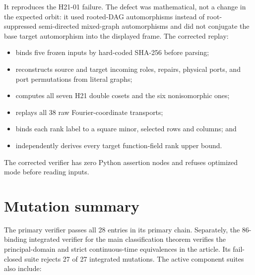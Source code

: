 \documentclass[10pt]{article}
\begin{document}
It reproduces the H21-01 failure.  The defect was mathematical, not a change
in the expected orbit: it used rooted-DAG automorphisms instead of
root-suppressed semi-directed mixed-graph automorphisms and did not conjugate
the base target automorphism into the displayed frame.  The corrected replay:

\begin{itemize}
\item binds five frozen inputs by hard-coded SHA-256 before parsing;
\item reconstructs source and target incoming roles, repairs, physical ports,
and port permutations from literal graphs;
\item computes all seven H21 double cosets and the six nonisomorphic ones;
\item replays all 38 raw Fourier-coordinate transports;
\item binds each rank label to a square minor, selected rows and columns; and
\item independently derives every target function-field rank upper bound.
\end{itemize}

The corrected verifier has zero Python assertion nodes and refuses optimized
mode before reading inputs.

\section{Mutation summary}

The primary verifier passes all 28 entries in its primary chain.  Separately,
the 86-binding integrated verifier for the main classification theorem verifies the
principal-domain and strict continuous-time equivalences in the article.  Its
fail-closed suite rejects 27 of 27 integrated mutations.  The active component
suites also include:
\end{document}
